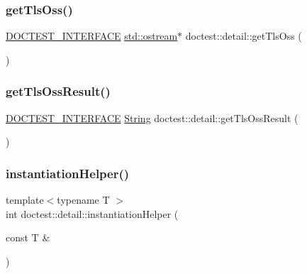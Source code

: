 \mbox{\label{namespacedoctest_1_1detail_a52299f4a981a01a3d3fe6e8d7518823d}} 
\subsubsection{\texorpdfstring{get\+Tls\+Oss()}{getTlsOss()}}
{\footnotesize\ttfamily \hyperlink{doctest_8h_a9c16ffc635ec47f07797d21ede26b1a5}{D\+O\+C\+T\+E\+S\+T\+\_\+\+I\+N\+T\+E\+R\+F\+A\+CE} \hyperlink{doctest_8h_a116af65cb5e924b33ad9d9ecd7a783f3}{std\+::ostream}$\ast$ doctest\+::detail\+::get\+Tls\+Oss (\begin{DoxyParamCaption}{ }\end{DoxyParamCaption})}

\mbox{\label{namespacedoctest_1_1detail_a7b0b3df5fe79d7ffa8fa138201476df1}} 
\subsubsection{\texorpdfstring{get\+Tls\+Oss\+Result()}{getTlsOssResult()}}
{\footnotesize\ttfamily \hyperlink{doctest_8h_a9c16ffc635ec47f07797d21ede26b1a5}{D\+O\+C\+T\+E\+S\+T\+\_\+\+I\+N\+T\+E\+R\+F\+A\+CE} \hyperlink{classdoctest_1_1String}{String} doctest\+::detail\+::get\+Tls\+Oss\+Result (\begin{DoxyParamCaption}{ }\end{DoxyParamCaption})}

\mbox{\label{namespacedoctest_1_1detail_aad401b097a9af4df1d4a9d0911957c0f}} 
\subsubsection{\texorpdfstring{instantiation\+Helper()}{instantiationHelper()}}
{\footnotesize\ttfamily template$<$typename T $>$ \\
int doctest\+::detail\+::instantiation\+Helper (\begin{DoxyParamCaption}\item[{const T \&}]{ }\end{DoxyParamCaption})}

